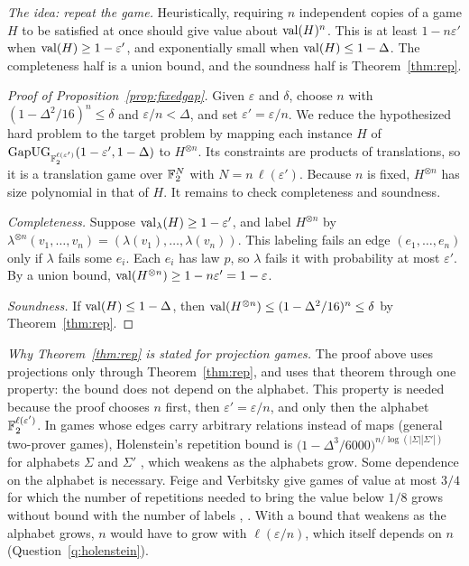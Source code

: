 \emph{The idea: repeat the game.} Heuristically, requiring $n$ independent copies of a game $H$ to be satisfied at once should give value about $\operatorname{val}(H)^n$. This is at least $1-n\varepsilon'$ when $\operatorname{val}(H)\ge1-\varepsilon'$, and exponentially small when $\operatorname{val}(H)\le1-\Delta$. The completeness half is a union bound, and the soundness half is Theorem~\ref{thm:rep}.

\begin{proof}[Proof of Proposition~\ref{prop:fixedgap}]
Given $\varepsilon$ and $\delta$, choose $n$ with $(1-\Delta^2/16)^n\le\delta$ and $\varepsilon/n<\Delta$, and set $\varepsilon'=\varepsilon/n$. We reduce the hypothesized hard problem to the target problem by mapping each instance $H$ of $\mathrm{GapUG}_{\mathbb{F}_2^{\ell(\varepsilon')}}(1-\varepsilon',1-\Delta)$ to $H^{\otimes n}$. Its constraints are products of translations, so it is a translation game over $\mathbb{F}_2^N$ with $N=n\,\ell(\varepsilon')$. Because $n$ is fixed, $H^{\otimes n}$ has size polynomial in that of $H$. It remains to check completeness and soundness.

\emph{Completeness.} Suppose $\operatorname{val}_\lambda(H)\ge1-\varepsilon'$, and label $H^{\otimes n}$ by $\lambda^{\otimes n}(v_1,\dots,v_n)=(\lambda(v_1),\dots,\lambda(v_n))$. This labeling fails an edge $(e_1,\dots,e_n)$ only if $\lambda$ fails some $e_i$. Each $e_i$ has law $p$, so $\lambda$ fails it with probability at most $\varepsilon'$. By a union bound, $\operatorname{val}(H^{\otimes n})\ge1-n\varepsilon'=1-\varepsilon$.

\emph{Soundness.} If $\operatorname{val}(H)\le1-\Delta$, then $\operatorname{val}(H^{\otimes n})\le(1-\Delta^2/16)^n\le\delta$ by Theorem~\ref{thm:rep}.
\end{proof}

\emph{Why Theorem~\ref{thm:rep} is stated for projection games.} The proof above uses projections only through Theorem~\ref{thm:rep}, and uses that theorem through one property: the bound does not depend on the alphabet. This property is needed because the proof chooses $n$ first, then $\varepsilon'=\varepsilon/n$, and only then the alphabet $\mathbb{F}_2^{\ell(\varepsilon')}$. In games whose edges carry arbitrary relations instead of maps (general two-prover games), Holenstein's repetition bound is $\bigl(1-\Delta^3/6000\bigr)^{n/\log(|\Sigma||\Sigma'|)}$ for alphabets $\Sigma$ and $\Sigma'$ \cite[Theorem~2.5]{Hol09}, which weakens as the alphabets grow. Some dependence on the alphabet is necessary. Feige and Verbitsky give games of value at most $3/4$ for which the number of repetitions needed to bring the value below $1/8$ grows without bound with the number of labels \cite{FV02}, \cite[Section~1]{Hol09}. With a bound that weakens as the alphabet grows, $n$ would have to grow with $\ell(\varepsilon/n)$, which itself depends on $n$ (Question~\ref{q:holenstein}).
